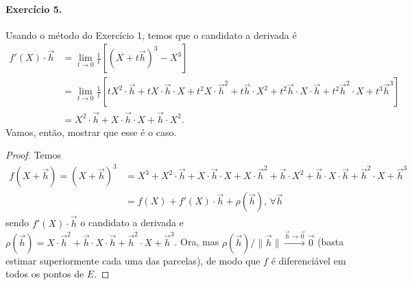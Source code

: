 \documentclass[12pt,a4paper]{article}
\begin{document}
\paragraph{Exercício 5.}
    Usando o método do Exercício 1, temos que o candidato a derivada é
    \begin{align*}
        f'(X)\cdot\vec{h} &= \lim_{t\to 0}\frac{1}{t}\left[ (X+t\vec{h})^3 - X^3 \right] \\
                          &= \lim_{t\to 0}\frac{1}{t}\left[ tX^2\cdot\vec{h} + tX\cdot\vec{h}\cdot X
                          + t^2X\cdot\vec{h}^2 + t\vec{h}\cdot X^2 + t^2\vec{h}\cdot X\cdot\vec{h}
                          + t^2\vec{h}^2\cdot X + t^3\vec{h}^3 \right] \\
                          &= X^2\cdot\vec{h} + X\cdot\vec{h}\cdot X + \vec{h}\cdot X^2.
    \end{align*}    
    Vamos, então, mostrar que esse é o caso.
    \begin{proof}
        Temos
        \begin{align*}
            f(X+\vec{h}) = (X+\vec{h})^3 &= X^3 + X^2\cdot\vec{h} + X\cdot\vec{h}\cdot X
                                         + X\cdot\vec{h}^2 + \vec{h}\cdot X^2 + \vec{h}\cdot X\cdot\vec{h}
                                         + \vec{h}^2\cdot X + \vec{h}^3 \\
                                         &= f(X) + f'(X)\cdot\vec{h} + \rho(\vec{h}), \, \forall\vec{h}
        \end{align*}
        sendo $f'(X)\cdot\vec{h}$ o candidato a derivada e $\rho(\vec{h}) = X\cdot\vec{h}^2 + 
        \vec{h}\cdot X\cdot\vec{h} + \vec{h}^2\cdot X + \vec{h}^3$. Ora, mas 
        $\rho(\vec{h})/\|\vec{h}\| \xrightarrow{\vec{h}\to\vec{0}} \vec{0}$ (basta estimar superiormente
        cada uma das parcelas), de modo que $f$ é diferenciável em todos os pontos de $E$.
    \end{proof}
%
\end{document}
